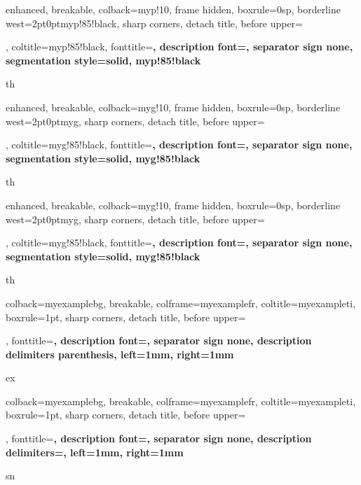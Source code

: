 {enhanced, breakable, colback=myp!10, frame hidden, boxrule=0sp, 
 borderline west={2pt}{0pt}{myp!85!black}, sharp corners, detach title, 
 before upper={\renewcommand{\familydefault}{\sfdefault}\selectfont\tcbtitle\par\smallskip}, 
 coltitle=myp!85!black, fonttitle=\bfseries\sffamily, description font=\mdseries, 
 separator sign none, segmentation style={solid, myp!85!black}}{th}

{enhanced, breakable, colback=myg!10, frame hidden, boxrule=0sp, 
 borderline west={2pt}{0pt}{myg}, sharp corners, detach title, 
 before upper={\renewcommand{\familydefault}{\sfdefault}\selectfont\tcbtitle\par\smallskip}, 
 coltitle=myg!85!black, fonttitle=\bfseries\sffamily, description font=\mdseries, 
 separator sign none, segmentation style={solid, myg!85!black}}{th}

{enhanced, breakable, colback=myg!10, frame hidden, boxrule=0sp, 
 borderline west={2pt}{0pt}{myg}, sharp corners, detach title, 
 before upper={\renewcommand{\familydefault}{\sfdefault}\selectfont\tcbtitle\par\smallskip}, 
 coltitle=myg!85!black, fonttitle=\bfseries\sffamily, description font=\mdseries, 
 separator sign none, segmentation style={solid, myg!85!black}}{th}

{colback=myexamplebg, breakable, colframe=myexamplefr, coltitle=myexampleti, 
 boxrule=1pt, sharp corners, detach title, 
 before upper={\renewcommand{\familydefault}{\sfdefault}\selectfont\tcbtitle\par\smallskip}, 
 fonttitle=\bfseries\sffamily, description font=\mdseries, 
 separator sign none, description delimiters parenthesis,
 left=1mm, %
 right=1mm %
}{ex}

{colback=myexamplebg, breakable, colframe=myexamplefr, coltitle=myexampleti, 
 boxrule=1pt, sharp corners, detach title, 
 before upper={\renewcommand{\familydefault}{\sfdefault}\selectfont\tcbtitle\par\smallskip}, 
 fonttitle=\bfseries\sffamily, description font=\mdseries, 
 separator sign none, description delimiters={}, %
 left=1mm, %
 right=1mm %
}{sn}


